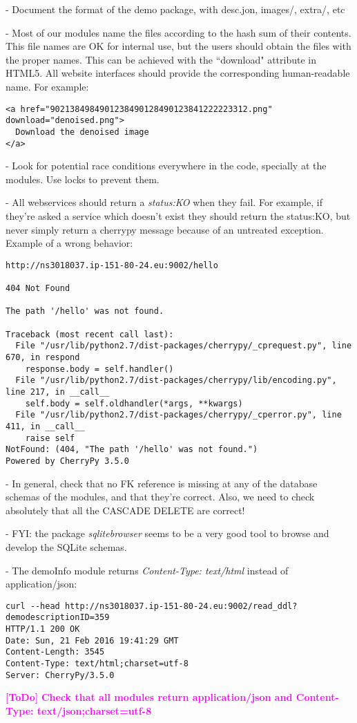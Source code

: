 \documentclass[a4paper,12pt]{article}
\newcommand{\ToDo}[1]{\textcolor{magenta}{\textbf{[ToDo]} \textbf{#1}}}
\begin{document}
- Document the format of the demo package, with desc.jon, images/, extra/, etc

- Most of our modules name the files according to the hash sum of their contents. This file names are OK for internal use, but the users should obtain the files with the proper names. This can be achieved with the ``download" attribute in HTML5. All website interfaces should provide the corresponding human-readable name. For example:

\begin{verbatim}
<a href="9021384984901238490128490123841222223312.png" download="denoised.png">
  Download the denoised image
</a>
\end{verbatim}

- Look for potential race conditions everywhere in the code, specially at the modules. Use locks to prevent them.

- All webservices should return a \emph{status:KO} when they fail. For example, if they're asked a service which doesn't exist they should return the status:KO, but never simply return a cherrypy message because of an untreated exception. Example of a wrong behavior:

\begin{verbatim}
http://ns3018037.ip-151-80-24.eu:9002/hello

404 Not Found

The path '/hello' was not found.

Traceback (most recent call last):
  File "/usr/lib/python2.7/dist-packages/cherrypy/_cprequest.py", line 670, in respond
    response.body = self.handler()
  File "/usr/lib/python2.7/dist-packages/cherrypy/lib/encoding.py", line 217, in __call__
    self.body = self.oldhandler(*args, **kwargs)
  File "/usr/lib/python2.7/dist-packages/cherrypy/_cperror.py", line 411, in __call__
    raise self
NotFound: (404, "The path '/hello' was not found.")
Powered by CherryPy 3.5.0
\end{verbatim}

- In general, check that no FK reference is missing at any of the database schemas of the modules, and that they're correct.
Also, we need to check absolutely that all the CASCADE DELETE are correct!

- FYI: the package \emph{sqlitebrowser} seems to be a very good tool to browse and develop the SQLite schemas.

- The demoInfo module returns \emph{Content-Type: text/html} instead of application/json:

\begin{verbatim}
curl --head http://ns3018037.ip-151-80-24.eu:9002/read_ddl?demodescriptionID=359
HTTP/1.1 200 OK
Date: Sun, 21 Feb 2016 19:41:29 GMT
Content-Length: 3545
Content-Type: text/html;charset=utf-8
Server: CherryPy/3.5.0
\end{verbatim}
\ToDo{Check that all modules return application/json and Content-Type: text/json;charset=utf-8}
\end{document}
